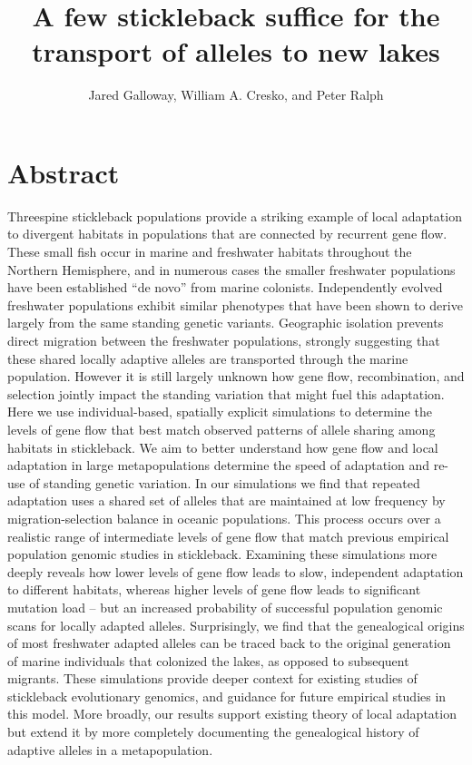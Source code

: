 \documentclass{article}
\begin{document}
\title{A few stickleback suffice for the transport of alleles to new lakes}
\author{Jared Galloway, William A. Cresko, and Peter Ralph}
\maketitle


\section*{Abstract}

Threespine stickleback populations provide a striking example of local adaptation to divergent habitats 
in populations that are connected by recurrent gene flow. 
These small fish occur in marine and freshwater habitats throughout the Northern Hemisphere, and in numerous cases the smaller freshwater populations have been established ``de novo'' from marine colonists. 
Independently evolved freshwater populations exhibit similar phenotypes that have been shown to derive largely from the same standing genetic variants.
Geographic isolation prevents direct migration between the freshwater populations, strongly suggesting that these shared locally adaptive alleles are transported through the marine population.
However it is still largely unknown how gene flow, recombination, and selection jointly impact the standing variation that might fuel this adaptation.
Here we use individual-based, spatially explicit simulations to determine the levels of gene flow that best match observed patterns of allele sharing among habitats in stickleback.
We aim to better understand how gene flow and local adaptation in large metapopulations determine the speed of adaptation and re-use of standing genetic variation. 
In our simulations we find that repeated adaptation uses a shared set of alleles that are maintained at low frequency by migration-selection balance in oceanic populations. 
This process occurs over a realistic range of intermediate levels of gene flow that match previous empirical population genomic studies in stickleback. 
Examining these simulations more deeply reveals how lower levels of gene flow leads to slow, independent adaptation to different habitats, whereas higher levels of gene flow leads to significant mutation load -- but an increased probability of successful population genomic scans for locally adapted alleles. 
Surprisingly, we find that the genealogical origins of most freshwater adapted alleles can be traced back to the original generation of marine individuals that colonized the lakes, as opposed to subsequent migrants. 
These simulations provide deeper context for existing studies of stickleback evolutionary genomics, and guidance for future empirical studies in this model.
More broadly, our results support existing theory of local adaptation but extend it by more completely documenting the genealogical history of adaptive alleles in a metapopulation.  
\end{document}
